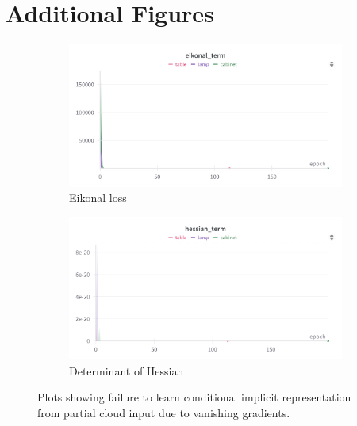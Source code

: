 \chapter{Additional Figures}\label{ch:additional_qual}

\begin{figure}[htb]
\centering
\begin{subfigure}{0.45\textwidth}
    \includegraphics[width=\linewidth]{figures/hessianfail/eikonal.png}
    \caption{Eikonal loss}
\end{subfigure}
\hfill
\begin{subfigure}{0.45\textwidth}
    \includegraphics[width=\linewidth]{figures/hessianfail/hessian.png}
    \caption{Determinant of Hessian}
\end{subfigure}
\caption{Plots showing failure to learn conditional implicit representation from partial cloud input due to vanishing gradients.}
\label{fig:hessianfail}
\end{figure}

